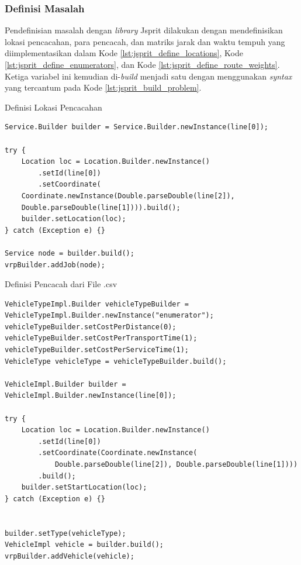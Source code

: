 \subsubsection{Definisi Masalah}
Pendefinisian masalah dengan \textit{library} Jsprit dilakukan dengan mendefinisikan lokasi pencacahan, para pencacah, dan matriks jarak dan waktu tempuh yang diimplementasikan dalam Kode \ref{lst:jsprit_define_locations}, Kode \ref{lst:jsprit_define_enumerators}, dan Kode \ref{lst:jsprit_define_route_weights}. Ketiga variabel ini kemudian di-\textit{build} menjadi satu dengan menggunakan \textit{syntax} yang tercantum pada Kode \ref{lst:jsprit_build_problem}.


\begin{listing}[!]
	\captionsetup{format=hang}
	\caption{Definisi Lokasi Pencacahan}
	\label{lst:jsprit_define_locations}
	\begin{verbatim}
Service.Builder builder = Service.Builder.newInstance(line[0]);

try {
	Location loc = Location.Builder.newInstance()
		.setId(line[0])
		.setCoordinate(
	Coordinate.newInstance(Double.parseDouble(line[2]), 
	Double.parseDouble(line[1]))).build();
	builder.setLocation(loc);
} catch (Exception e) {}

Service node = builder.build();
vrpBuilder.addJob(node);
	\end{verbatim}
\end{listing}


\begin{listing}[!]
	\captionsetup{format=hang}
	\caption{Definisi Pencacah dari File .csv}
	\label{lst:jsprit_define_enumerators}
	\begin{verbatim}
VehicleTypeImpl.Builder vehicleTypeBuilder = VehicleTypeImpl.Builder.newInstance("enumerator");
vehicleTypeBuilder.setCostPerDistance(0);
vehicleTypeBuilder.setCostPerTransportTime(1);
vehicleTypeBuilder.setCostPerServiceTime(1);
VehicleType vehicleType = vehicleTypeBuilder.build();

VehicleImpl.Builder builder = VehicleImpl.Builder.newInstance(line[0]);

try {
	Location loc = Location.Builder.newInstance()
		.setId(line[0])
		.setCoordinate(Coordinate.newInstance(
			Double.parseDouble(line[2]), Double.parseDouble(line[1])))
		.build();
	builder.setStartLocation(loc);
} catch (Exception e) {}


builder.setType(vehicleType);
VehicleImpl vehicle = builder.build();
vrpBuilder.addVehicle(vehicle);
	\end{verbatim}
\end{listing}


